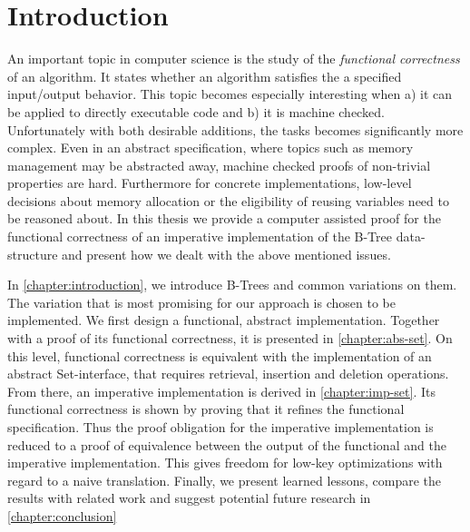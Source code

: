 

\chapter{Introduction}\label{chapter:introduction}

An important topic in computer science is the study of the
\textit{functional correctness} of an algorithm.
It states whether an algorithm satisfies the a specified
input/output behavior.
This topic becomes especially interesting when a) it can be applied
to directly executable code and b) it is machine checked.
Unfortunately with both desirable additions, the tasks becomes
significantly more complex.
Even in an abstract specification, where topics such as
memory management may be abstracted away,
machine checked proofs of non-trivial properties
are hard.
Furthermore for concrete implementations,
low-level decisions about memory allocation or
the eligibility of reusing variables need to be
reasoned about.
In this thesis we provide a computer assisted proof for the functional
correctness of an imperative implementation of the B-Tree data-structure
and present how we dealt with the above mentioned issues.

In \autoref{chapter:introduction}, we introduce B-Trees and common variations
on them.
The variation that is most promising for our approach is chosen
to be implemented.
We first design a functional, abstract implementation.
Together with a proof of its functional correctness,
it is presented in \autoref{chapter:abs-set}.
On this level, functional correctness is equivalent with the
implementation of an abstract Set-interface,
that requires retrieval, insertion and deletion operations.
From there, an imperative implementation is derived in \autoref{chapter:imp-set}.
Its functional correctness is shown by proving that it refines the functional specification.
Thus the proof obligation for the imperative implementation
is reduced to a proof of equivalence between the output of the
functional and the imperative implementation.
This gives freedom for low-key optimizations with regard to a naive translation.
Finally, we present learned lessons, compare the results with related work and suggest potential future
research in \autoref{chapter:conclusion}


